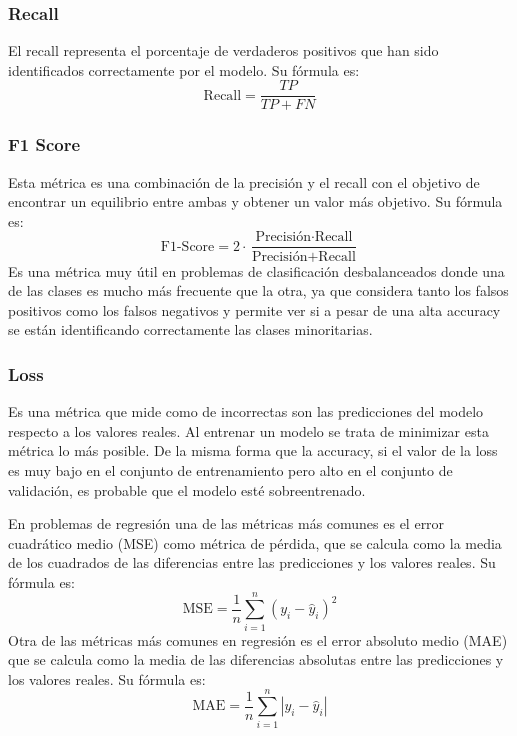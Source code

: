 \subsubsection{Recall}

El recall representa el porcentaje de verdaderos positivos que han sido identificados correctamente por el modelo.
Su fórmula es:
\begin{equation}
	\text{Recall} = \frac{TP}{TP + FN}
\end{equation}

\subsubsection{F1 Score}

Esta métrica es una combinación de la precisión y el recall con el objetivo de encontrar un equilibrio entre ambas y obtener un valor más objetivo.
Su fórmula es:
\begin{equation}
	\text{F1-Score} = 2 \cdot \frac{\text{Precisión} \cdot \text{Recall}}{\text{Precisión} + \text{Recall}}
\end{equation}
Es una métrica muy útil en problemas de clasificación desbalanceados donde una de las clases es mucho más frecuente que la otra, ya que considera tanto los falsos positivos como los falsos negativos y permite ver si a pesar de una alta accuracy se están identificando correctamente las clases minoritarias.

\subsubsection{Loss}

Es una métrica que mide como de incorrectas son las predicciones del modelo respecto a los valores reales. \cite{google:linear-regression}
Al entrenar un modelo se trata de minimizar esta métrica lo más posible. 
De la misma forma que la accuracy, si el valor de la loss es muy bajo en el conjunto de entrenamiento pero alto en el conjunto de validación, es probable que el modelo esté sobreentrenado.

En problemas de regresión una de las métricas más comunes es el error cuadrático medio (MSE) como métrica de pérdida, que se calcula como la media de los cuadrados de las diferencias entre las predicciones y los valores reales. Su fórmula es: \begin{equation}
	\text{MSE} = \frac{1}{n} \sum_{i=1}^{n} (y_i - \hat{y}_i)^2
\end{equation}
Otra de las métricas más comunes en regresión es el error absoluto medio (MAE) que se calcula como la media de las diferencias absolutas entre las predicciones y los valores reales. Su fórmula es: \begin{equation}
	\text{MAE} = \frac{1}{n} \sum_{i=1}^{n} |y_i - \hat{y}_i|
\end{equation}

